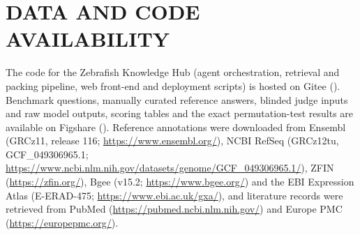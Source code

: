 %
%
%
%

% 

\section*{DATA AND CODE AVAILABILITY}

The code for the Zebrafish Knowledge Hub (agent orchestration, retrieval and
packing pipeline, web front-end and deployment scripts) is hosted on Gitee
(). Benchmark questions, manually curated reference answers,
blinded judge inputs and raw model outputs, scoring tables and the exact
permutation-test results are available on Figshare
(). Reference annotations were downloaded from Ensembl
(GRCz11, release 116; \url{https://www.ensembl.org/}), NCBI RefSeq (GRCz12tu,
GCF\_049306965.1; \url{https://www.ncbi.nlm.nih.gov/datasets/genome/GCF_049306965.1/}),
ZFIN (\url{https://zfin.org/}), Bgee (v15.2; \url{https://www.bgee.org/}) and the
EBI Expression Atlas (E-ERAD-475; \url{https://www.ebi.ac.uk/gxa/}), and literature
records were retrieved from PubMed (\url{https://pubmed.ncbi.nlm.nih.gov/}) and
Europe PMC (\url{https://europepmc.org/}).

